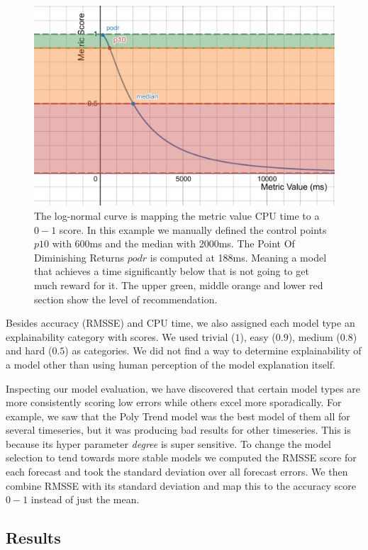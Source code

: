 \begin{figure}
\centerline{\includegraphics[scale=.33]{Figures/metric-mapping.pdf}}
\caption{The log-normal curve is mapping the metric value CPU time to a $0-1$ score. In this example we manually defined the control points $p10$ with 600ms and the median with 2000ms. The Point Of Diminishing Returns $podr$ is computed at 188ms. Meaning a model that achieves a time significantly below that is not going to get much reward for it. The upper green, middle orange and lower red section show the level of recommendation.}
\label{fig:metric-mapping}
\end{figure}

Besides accuracy (RMSSE) and CPU time, we also assigned each model type an explainability category with scores. We used trivial ($1$), easy ($0.9$), medium ($0.8$) and hard ($0.5$) as categories. We did not find a way to determine explainability of a model other than using human perception of the model explanation itself.

Inspecting our model evaluation, we have discovered that certain model types are more consistently scoring low errors while others excel more sporadically. For example, we saw that the Poly Trend model was the best model of them all for several timeseries, but it was producing bad results for other timeseries. This is because its hyper parameter \emph{degree} is super sensitive. To change the model selection to tend towards more stable models we computed the RMSSE score for each forecast and took the standard deviation over all forecast errors. We then combine RMSSE with its standard deviation and map this to the accuracy score $0-1$ instead of just the mean.


\subsection{Results}

